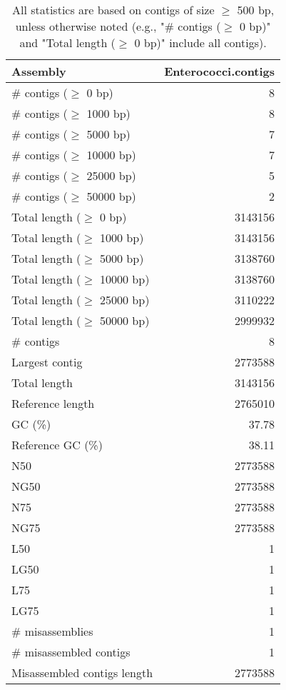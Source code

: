 \documentclass[12pt,a4paper]{article}
\begin{document}
\begin{table}[ht]
\begin{center}
\caption{All statistics are based on contigs of size $\geq$ 500 bp, unless otherwise noted (e.g., "\# contigs ($\geq$ 0 bp)" and "Total length ($\geq$ 0 bp)" include all contigs).}
\begin{tabular}{|l*{1}{|r}|}
\hline
Assembly & Enterococci.contigs \\ \hline
\# contigs ($\geq$ 0 bp) & 8 \\ \hline
\# contigs ($\geq$ 1000 bp) & 8 \\ \hline
\# contigs ($\geq$ 5000 bp) & 7 \\ \hline
\# contigs ($\geq$ 10000 bp) & 7 \\ \hline
\# contigs ($\geq$ 25000 bp) & 5 \\ \hline
\# contigs ($\geq$ 50000 bp) & 2 \\ \hline
Total length ($\geq$ 0 bp) & 3143156 \\ \hline
Total length ($\geq$ 1000 bp) & 3143156 \\ \hline
Total length ($\geq$ 5000 bp) & 3138760 \\ \hline
Total length ($\geq$ 10000 bp) & 3138760 \\ \hline
Total length ($\geq$ 25000 bp) & 3110222 \\ \hline
Total length ($\geq$ 50000 bp) & 2999932 \\ \hline
\# contigs & 8 \\ \hline
Largest contig & 2773588 \\ \hline
Total length & 3143156 \\ \hline
Reference length & 2765010 \\ \hline
GC (\%) & 37.78 \\ \hline
Reference GC (\%) & 38.11 \\ \hline
N50 & 2773588 \\ \hline
NG50 & 2773588 \\ \hline
N75 & 2773588 \\ \hline
NG75 & 2773588 \\ \hline
L50 & 1 \\ \hline
LG50 & 1 \\ \hline
L75 & 1 \\ \hline
LG75 & 1 \\ \hline
\# misassemblies & 1 \\ \hline
\# misassembled contigs & 1 \\ \hline
Misassembled contigs length & 2773588 \\ \hline

\end{tabular}
\end{center}
\end{table}
\end{document}
